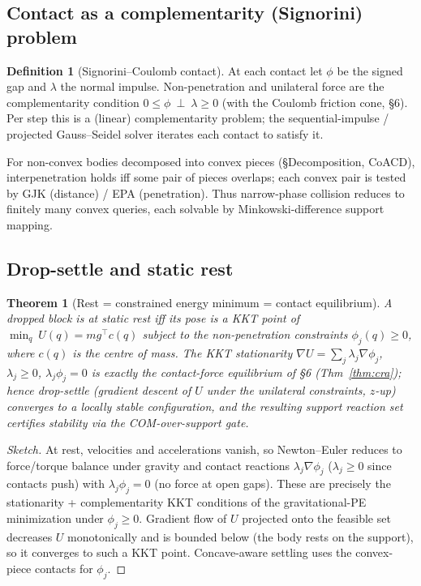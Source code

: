 \documentclass[11pt]{article}
\theoremstyle{definition}\newtheorem{definition}{Definition}[section]
\theoremstyle{plain}\newtheorem{theorem}{Theorem}[section]
\begin{document}
\subsection{Contact as a complementarity (Signorini) problem}
\begin{definition}[Signorini--Coulomb contact]
At each contact let $\phi$ be the signed gap and $\lambda$ the normal impulse. Non-penetration and
unilateral force are the complementarity condition $0\le\phi\ \perp\ \lambda\ge0$ (with the Coulomb friction
cone, \S6). Per step this is a (linear) complementarity problem; the sequential-impulse / projected
Gauss--Seidel solver iterates each contact to satisfy it.
\end{definition}
\begin{proposition}
For non-convex bodies decomposed into convex pieces (\S Decomposition, CoACD), interpenetration holds iff some
pair of pieces overlaps; each convex pair is tested by GJK (distance) / EPA (penetration). Thus narrow-phase
collision reduces to finitely many convex queries, each solvable by Minkowski-difference support mapping.
\end{proposition}
\subsection{Drop-settle and static rest}
\begin{theorem}[Rest = constrained energy minimum = contact equilibrium]\label{thm:settle}
A dropped block is at static rest iff its pose is a KKT point of
$\min_{q}\ U(q)=m g^\top c(q)$ subject to the non-penetration constraints $\phi_j(q)\ge0$, where $c(q)$ is the
centre of mass. The KKT stationarity $\nabla U=\sum_j\lambda_j\nabla\phi_j$, $\lambda_j\ge0$,
$\lambda_j\phi_j=0$ is exactly the contact-force equilibrium of \S6 (Thm~\ref{thm:cra}); hence
drop-settle (gradient descent of $U$ under the unilateral constraints, $z$-up) converges to a locally stable
configuration, and the resulting support reaction set certifies stability via the COM-over-support gate.
\end{theorem}
\begin{proof}[Sketch]
At rest, velocities and accelerations vanish, so Newton--Euler reduces to force/torque balance under gravity
and contact reactions $\lambda_j\nabla\phi_j$ ($\lambda_j\ge0$ since contacts push) with $\lambda_j\phi_j=0$
(no force at open gaps). These are precisely the stationarity + complementarity KKT conditions of the
gravitational-PE minimization under $\phi_j\ge0$. Gradient flow of $U$ projected onto the feasible set
decreases $U$ monotonically and is bounded below (the body rests on the support), so it converges to such a
KKT point. Concave-aware settling uses the convex-piece contacts for $\phi_j$.
\end{proof}
\end{document}
